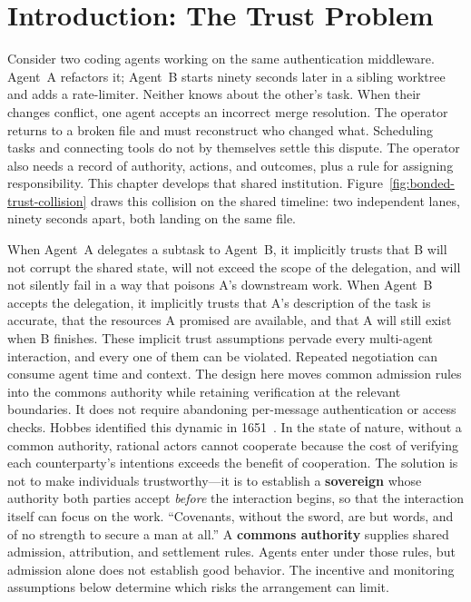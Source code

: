 \documentclass[11pt,a4paper]{article}
\theoremstyle{definition}
\theoremstyle{remark}
\begin{document}
\section{Introduction: The Trust Problem}
Consider two coding agents working on the same authentication middleware.
Agent~A refactors it; Agent~B starts ninety seconds later in a sibling
worktree and adds a rate-limiter. Neither knows about the other's task.
When their changes conflict, one agent accepts an incorrect merge resolution.
The operator returns to a broken file and must reconstruct who changed what.
Scheduling tasks and connecting tools do not by themselves settle this
dispute. The operator also needs a record of authority, actions, and outcomes,
plus a rule for assigning responsibility. This chapter develops that shared
institution.
Figure~\ref{fig:bonded-trust-collision} draws this collision on the shared timeline: two independent lanes, ninety seconds apart, both landing on the same file.

When Agent~A delegates a subtask to Agent~B, it implicitly trusts that B will not corrupt the shared state, will not exceed the scope of the delegation, and will not silently fail in a way that poisons A's downstream work. When Agent~B accepts the delegation, it implicitly trusts that A's description of the task is accurate, that the resources A promised are available, and that A will still exist when B finishes. These implicit trust assumptions pervade every multi-agent interaction, and every one of them can be violated.
Repeated negotiation can consume agent time and context. The design here
moves common admission rules into the commons authority while retaining
verification at the relevant boundaries. It does not require abandoning
per-message authentication or access checks.
Hobbes identified this dynamic in 1651~. In the state of nature, without a common authority, rational actors cannot cooperate because the cost of verifying each counterparty's intentions exceeds the benefit of cooperation. The solution is not to make individuals trustworthy---it is to establish a \textbf{sovereign} whose authority both parties accept \emph{before} the interaction begins, so that the interaction itself can focus on the work. ``Covenants, without the sword, are but words, and of no strength to secure a man at all.''
A \textbf{commons authority} supplies shared admission, attribution, and
settlement rules. Agents enter under those rules, but admission alone does
not establish good behavior. The incentive and monitoring assumptions below
determine which risks the arrangement can limit.
\end{document}
